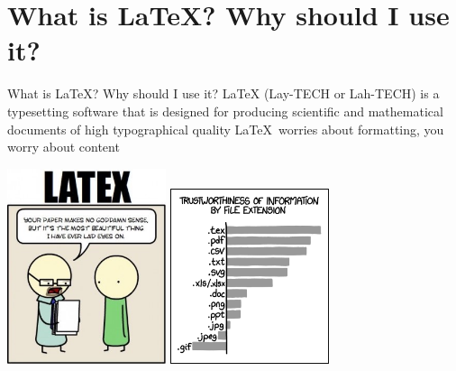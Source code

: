 \documentclass[10pt]{beamer}
\begin{document}
\section{What is \LaTeX? Why should I use it?}
\begin{frame}{What is \LaTeX? Why should I use it?}
	\bi LaTeX (Lay-TECH or Lah-TECH) is a typesetting software that is designed for producing scientific and mathematical documents of high typographical quality \ei
	\bi \LaTeX \, worries about formatting, you worry about content \ei
	\begin{center}
	\includegraphics[width=0.35\textwidth]{./figures/latex-comic.jpeg}
	\hspace{25pt}
	\includegraphics[width=0.35\textwidth]{./figures/file_extensions.png} %
	\end{center}
\end{frame}

\end{document}
